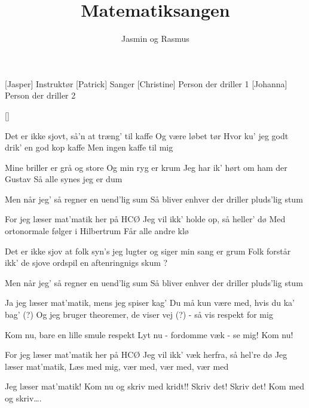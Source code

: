 \documentclass[a4paper,11pt]{article}
\title{Matematiksangen}
\author{Jasmin og Rasmus}
\begin{document}
\maketitle

\begin{roles}
[Jasper] Instruktør
[Patrick] Sanger
[Christine] Person der driller 1
[Johanna] Person der driller 2
\end{roles}

\begin{props}
[]
\end{props}

\begin{song}
 Det er ikke sjovt, så’n at træng’ til kaffe
Og være løbet tør
Hvor ku' jeg godt drik' en god kop kaffe
Men ingen kaffe til mig

Mine briller er grå og store
Og min ryg er krum
Jeg har ik’ hørt om ham der Gustav
Så alle synes jeg er dum


Men når jeg’ så regner en uend'lig sum
Så bliver enhver der driller pluds'lig stum


For jeg læser mat’matik her på HCØ
Jeg vil ikk’ holde op, så heller' dø
Med ortonormale følger i Hilbertrum
Får alle andre klø

Det er ikke sjov at folk syn’s jeg lugter
og siger min sang er grum
Folk forstår ikk’ de sjove ordspil
en aftenringnigs skum ?

 Men når jeg’ så regner en uend'lig sum
Så bliver enhver der driller pluds'lig stum


Ja jeg læser mat’matik, mens jeg spiser kag’
Du må kun være med, hvis du ka’ bag’
(?) Og jeg bruger theoremer, de viser vej
(?) - så vis respekt for mig


Kom nu, bare en lille smule respekt
Lyt nu - fordomme væk - se mig!
Kom nu!


For jeg læser mat’matik her på HCØ
Jeg vil ikk’ væk herfra, så hel’re dø
Jeg læser mat’matik,
Læs med mig, vær med, vær med, vær med


Jeg læser mat’matik!
Kom nu og skriv med kridt!! Skriv det! Skriv det! Kom med og skriv….
\end{song}
\end{document}
